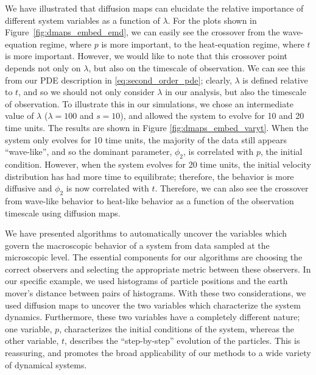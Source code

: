 \documentclass[prl, reprint, final, showkeys]{revtex4-1}
\begin{document}
We have illustrated that diffusion maps can elucidate the relative importance of different system variables as a function of $\lambda$.
%
For the plots shown in Figure~\ref{fig:dmaps_embed_emd}, we can easily see the crossover from the wave-equation regime, where $p$ is more important, to the heat-equation regime, where $t$ is more important. 
%
However, we would like to note that this crossover point depends not only on $\lambda$, but also on the timescale of observation.
%
We can see this from our PDE description in \eqref{eq:second_order_pde};
clearly, $\lambda$ is defined relative to $t$, and so we should not only consider $\lambda$ in our analysis, but also the timescale of observation.
%
To illustrate this in our simulations, we chose an intermediate value of $\lambda$ ($\lambda=100$ and $s=10$), and allowed the system to evolve for 10 and 20 time units. 
%
The results are shown in Figure \ref{fig:dmaps_embed_varyt}.
%
When the system only evolves for 10 time units, the majority of the data still appears ``wave-like'', and so the dominant parameter, $\phi_2$, is correlated with $p$, the initial condition.
%
However, when the system evolves for 20 time units, the initial velocity distribution has had more time to equilibrate; therefore, the behavior is more diffusive and $\phi_2$ is now correlated with $t$. 
%
Therefore, we can also see the crossover from wave-like behavior to heat-like behavior as a function of the observation timescale using diffusion maps.

We have presented algorithms to automatically uncover the variables which govern the macroscopic behavior of a system from data sampled at the microscopic level.
%
The essential components for our algorithms are choosing the correct observers and selecting the appropriate metric between these observers.
%
In our specific example, we used histograms of particle positions and the earth mover's distance between pairs of histograms.
%
With these two considerations, we used diffusion maps to uncover the two variables which characterize the system dynamics.
%
Furthermore, these two variables have a completely different nature;
one variable, $p$, characterizes the initial conditions of the system, whereas the other variable, $t$, describes the ``step-by-step'' evolution of the particles. 
%
This is reassuring, and promotes the broad applicability of our methods to a wide variety of dynamical systems. 





\end{document}
